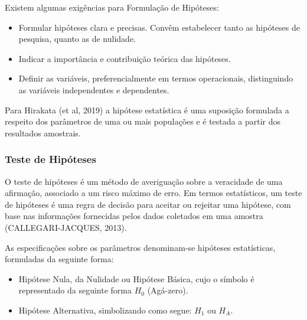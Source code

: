 Existem algumas exigências para Formulação de Hipóteses:

\begin{itemize}
\item Formular hipóteses clara e precisas. Convêm estabelecer tanto as hipóteses de pesquisa, quanto as de nulidade.  
\item Indicar a importância e contribuição teórica das hipóteses.
\item Definir as variáveis, preferencialmente em termos operacionais, distinguindo as variáveis independentes e dependentes. 
\end{itemize}

Para Hirakata (et al, 2019) a hipótese estatística é uma suposição formulada a respeito dos parâmetros de uma ou mais populações e é testada a partir dos resultados amostrais. 

\subsubsection{Teste de Hipóteses}

O teste de hipóteses é um método de averiguação sobre a veracidade de uma afirmação, associado a um risco máximo de erro. Em termos estatísticos, um teste de hipóteses é uma regra de decisão para aceitar ou rejeitar uma hipótese, com base nas informações fornecidas pelos dados coletados em uma amostra (CALLEGARI-JACQUES, 2013).\vskip0.3cm








As especificações sobre os parâmetros denominam-se hipóteses estatísticas, formuladas da seguinte forma:

\begin{itemize}
\item Hipótese Nula, da Nulidade ou Hipótese Básica, cujo o símbolo é representado da seguinte forma $H_{0}$ (Agá-zero).
\item Hipótese Alternativa, simbolizando como segue: $H_{1}$ ou $H_{A}$.
\end{itemize}

